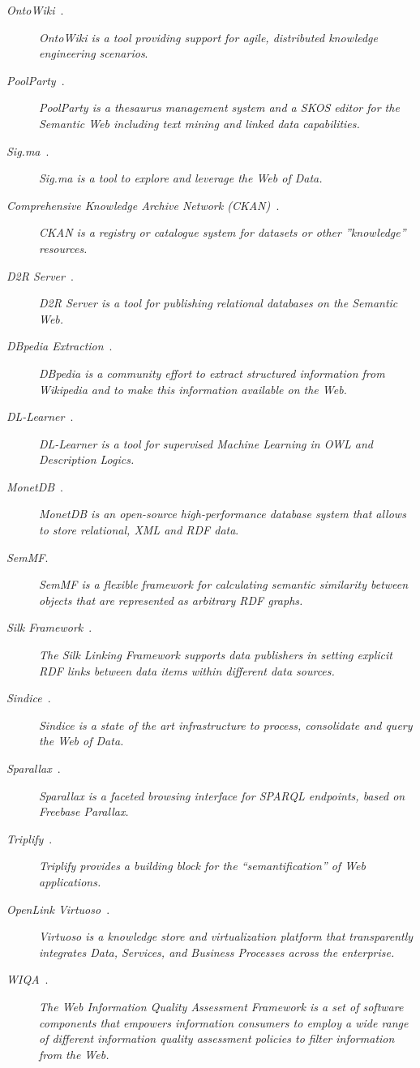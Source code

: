 \begin{description}
 \item [\textit{OntoWiki}~\cite{tramp-s-2010-ekaw-demo}.] \textit{OntoWiki is a tool providing support for agile, distributed knowledge engineering scenarios}. 
 \item [\textit{PoolParty}~\cite{poolparty}.] \textit{PoolParty is a thesaurus management system and a SKOS editor for the Semantic Web including text mining and linked data capabilities.}
 \item [\textit{Sig.ma}~\cite{citeulike:8529753}.] \textit{Sig.ma is a tool to explore and leverage the Web of Data.}
 \item [\textit{Comprehensive Knowledge Archive Network (CKAN)~\cite{ckan}}.] \textit{CKAN is a registry or catalogue system for datasets or other ''knowledge'' resources.}
 \item [\textit{D2R Server}~\cite{Bizer_Cyganiak_2006}.] \textit{D2R Server is a tool for publishing relational databases on the Semantic Web. }
 \item [\textit{DBpedia Extraction}~\cite{Bizer:2009:D-C:1640541.1640848}.] \textit{DBpedia is a community effort to extract structured information from Wikipedia and to make this information available on the Web.}
 \item [\textit{DL-Learner}~\cite{lehmann2009}.] \textit{DL-Learner is a tool for supervised Machine Learning in OWL and Description Logics.}
 \item [\textit{MonetDB}~\cite{Boncz06monetdb/xquery:a}.] \textit{MonetDB is an open-source high-performance database system that allows to store relational, XML and RDF data}.
 \item [\textit{SemMF}.] \textit{SemMF is a flexible framework for calculating semantic similarity between objects that are represented as arbitrary RDF graphs.}
 \item [\textit{Silk Framework}~\cite{www2009227}.] \textit{The Silk Linking Framework supports data publishers in setting explicit RDF links between data items within different data sources.}
 \item [\textit{Sindice}~\cite{TummarelloDO07}.] \textit{Sindice is a state of the art infrastructure to process, consolidate and query the Web of Data. }
 \item [\textit{Sparallax}~\cite{Sparallax}.] \textit{Sparallax is a faceted browsing interface for SPARQL endpoints, based on Freebase Parallax.}
 \item [\textit{Triplify}~\cite{Triplify}.] \textit{Triplify provides a building block for the ``semantification'' of Web applications.}
 \item [\textit{OpenLink Virtuoso}~\cite{Virtuoso}.] \textit{Virtuoso is a knowledge store and virtualization platform that transparently integrates Data, Services, and Business Processes across the enterprise.}
 \item [\textit{WIQA}~\cite{wiqa}.] \textit{The Web Information Quality Assessment Framework is a set of software components that empowers information consumers to employ a wide range of different information quality assessment policies to filter information from the Web.} 
\end{description}
